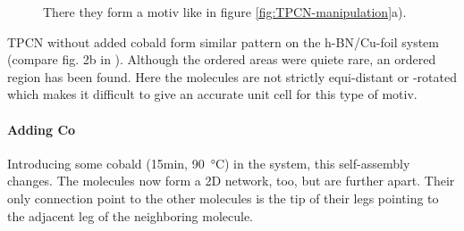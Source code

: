 \newpage
\begin{figure}[!h]
 \centering
\caption{There they form a motiv like in figure \ref{fig:TPCN-manipulation}a).}
\end{figure}

TPCN without added cobald form similar pattern on the h-BN/Cu-foil system (compare fig. 2b in \cite{urgel_controlling_2015}). Although the ordered areas were quiete rare, an ordered region has been found. Here the molecules are not strictly equi-distant or -rotated which makes it difficult to give an accurate unit cell for this type of motiv.

\newpage
\paragraph{Adding Co}
Introducing some cobald (15min, \SI{90}{\celsius}) in the system, this self-assembly changes. The molecules now form a 2D network, too, but are further apart. Their only connection point to the other molecules is the tip of their legs pointing to the adjacent leg of the neighboring molecule.

